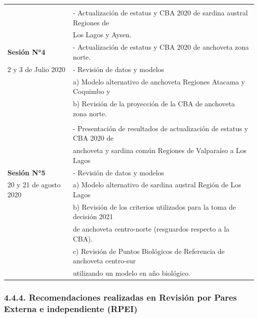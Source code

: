 \documentclass[
  spanish,
]{article}
\begin{document}
\begin{table}[h]
{\begin{tabular}{|l|l|}
                          & \\
                          & -   Actualización de estatus y CBA 2020 de sardina austral Regiones de \\
                          & Los  Lagos y Aysen.\\
  \textbf{Sesión N°4}     & -   Actualización de estatus y CBA 2020 de anchoveta zona norte. \\
  2 y 3 de Julio 2020     & -   Revisión de datos y modelos \\
                          &  a) Modelo alternativo de anchoveta Regiones Atacama y Coquimbo y \\
                          &  b) Revisión de la proyección de la CBA de anchoveta zona norte. \\ \hline
                          & \\
                          & -   Presentación de resultados de actualización de estatus y CBA 2020 de \\
                          &  anchoveta y sardina común Regiones de Valparaíso a Los Lagos \\
  \textbf{Sesión N°5}     & -   Revisión de datos y modelos \\
  20 y 21 de agosto 2020  &    a)   Modelo alternativo de sardina austral Región de Los Lagos \\
                          &    b)   Revisión de los criterios utilizados para la toma de decisión 2021 \\
                          &      de anchoveta centro-norte (resguardos respecto a la CBA). \\
                          &   c) Revisión de Puntos Biológicos de Referencia de anchoveta centro-sur \\
                          &      utilizando un modelo en año biológico. \\ \hline
  \end{tabular}}
    \end{table}

\normalsize

\pagebreak

\hypertarget{recomendaciones-realizadas-en-revisiuxf3n-por-pares-externa-e-independiente-rpei}{%
\subsubsection{4.4.4. Recomendaciones realizadas en Revisión por Pares
Externa e independiente
(RPEI)}\label{recomendaciones-realizadas-en-revisiuxf3n-por-pares-externa-e-independiente-rpei}}
\end{document}
